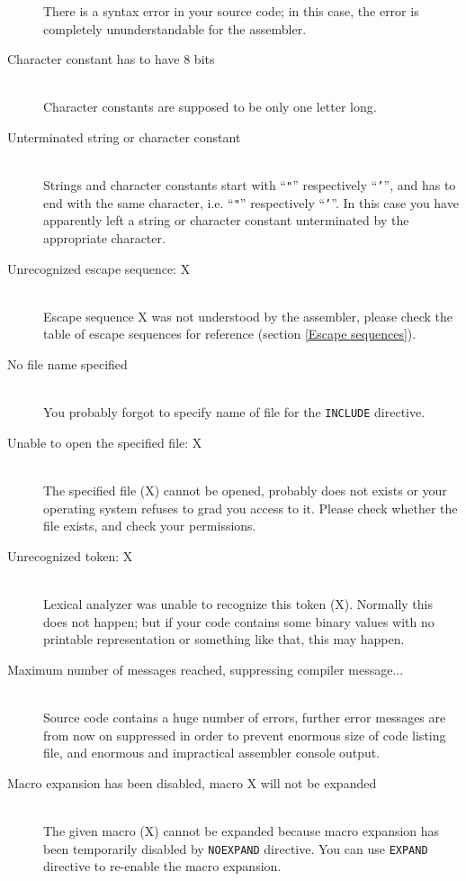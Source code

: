 \begin{description}
            There is a syntax error in your source code; in this case, the error is completely ununderstandable for the assembler.
        \item[Character constant has to have 8 bits]~\\
            Character constants are supposed to be only one letter long.
        \item[Unterminated string or character constant]~\\
            Strings and character constants start with ``\texttt{"}'' respectively ``\texttt{'}'', and has to end with the same character, i.e. ``\texttt{"}'' respectively ``\texttt{'}''. In this case you have apparently left a string or character constant unterminated by the appropriate character.
        \item[Unrecognized escape sequence: X]~\\
            Escape sequence X was not understood by the assembler, please check the table of escape sequences for reference (section \ref{Escape sequences}).
        \item[No file name specified]~\\
            You probably forgot to specify name of file for the \texttt{INCLUDE} directive.
        \item[Unable to open the specified file: X]~\\
            The specified file (X) cannot be opened, probably does not exists or your operating system refuses to grad you access to it. Please check whether the file exists, and check your permissions.
        \item[Unrecognized token: X]~\\
            Lexical analyzer was unable to recognize this token (X). Normally this does not happen; but if your code contains some binary values with no printable representation or something like that, this may happen.
        \item[Maximum number of messages reached, suppressing compiler message...]~\\
            Source code contains a huge number of errors, further error messages are from now on suppressed in order to prevent enormous size of code listing file, and enormous and impractical assembler console output.
        \item[Macro expansion has been disabled, macro X will not be expanded]~\\
            The given macro (X) cannot be expanded because macro expansion has been temporarily disabled by \texttt{NOEXPAND} directive. You can use \texttt{EXPAND} directive to re-enable the macro expansion.

\end{description}
